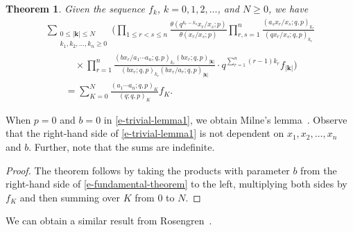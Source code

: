 \documentclass[pdftex]{sigma}
\numberwithin{equation}{section}
\newtheorem{Theorem}{Theorem}[section]
\newenvironment{Remark*}{\begin{remark*}\normalfont}{\end{remark*}}
\newcommand\sumk{{\left| \boldsymbol{k} \right|}}
\newcommand{\triprod}[1]{\prod\limits_{1\le r < s \le #1}}
\newcommand{\sqprod}[1]{\prod\limits_{r, s =1}^{#1}} %
\newcommand{\smallprod}[1]{\prod\limits_{r =1}^{#1}} %
\newcommand{\xover}[1]{#1_{r}/#1_{s}}
\newcommand{\ellipticqrfac}[2]{{\left({#1}; q, p\right)_{#2}}} %
\newcommand{\elliptictheta}[1]{\theta \left({#1} ; p\right) }
\newcommand{\ellipticvandermonde}[3]{\triprod{#3} %
\!\! \frac{\elliptictheta{q^{#2_r-#2_s} \xover {#1} }}{\elliptictheta{\xover{#1}}}
}
\begin{document}
\begin{Theorem}\label{th:e-trivial-lemma1} Given the sequence $f_k$, $k=0,1,2, \dots$, and $N\geq 0$, we have
\begin{gather}
\sum\limits_{\substack{0\leq \sumk \leq N \\
k_1,k_2, \dots, k_n\geq 0} }
 \Bigg( \ellipticvandermonde{x}{k}{n}
\sqprod n \frac{\ellipticqrfac{a_s\xover{x}}{k_r} }{\ellipticqrfac{q\xover{x}}{k_r} } \nonumber\\
\qquad\quad{} \times \smallprod n \frac{\ellipticqrfac{bx_r/a_1\cdots a_n}{k_r} \ellipticqrfac{bx_r}{\sumk}}
{\ellipticqrfac{bx_r}{k_r} \ellipticqrfac{bx_r/a_r}{\sumk}}
\cdot q^{\sum\limits_{r=1}^n (r-1)k_r} f_{\sumk} \Bigg)\nonumber\\
\qquad{} = \sum_{K=0}^N\frac{\ellipticqrfac{a_1\cdots a_n}{K}}{\ellipticqrfac{q}{K}} f_K .\label{e-trivial-lemma1}
\end{gather}
\end{Theorem}
\begin{Remark*} When $p=0$ and $b=0$ in \eqref{e-trivial-lemma1}, we obtain Milne's lemma~\cite[Lemma~7.3]{Milne1997}. Observe that the right-hand side of \eqref{e-trivial-lemma1} is not dependent on $x_1, x_2, \dots, x_n$ and $b$. Further, note that the sums are indefinite.
\end{Remark*}
\begin{proof} The theorem follows by taking the products with parameter $b$ from the right-hand side of \eqref{e-fundamental-theorem} to the left, multiplying both sides by $f_K$ and then summing over $K$ from $0$ to $N$.
\end{proof}

\begin{Remark*} We can obtain a similar result from Rosengren~\cite[Theorem~3.1]{HR2017a}.
\end{Remark*}
\end{document}
